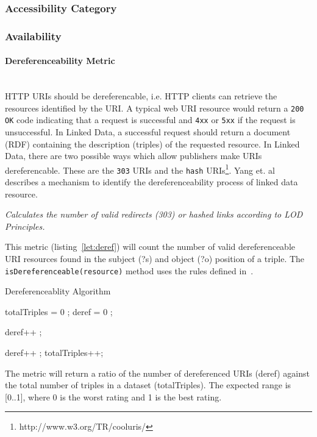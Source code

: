
\subsubsection{Accessibility Category}
\label{sec:Accessibility} 

\subsubsection{Availability} %

\paragraph{Dereferenceability Metric} ~\\ %
HTTP URIs should be dereferencable, i.e. HTTP clients can retrieve the resources identified by the URI.
A typical web URI resource would return a \texttt{200 OK} code indicating that a request is successful and \texttt{4xx} or \texttt{5xx} if the request is unsuccessful. 
In Linked Data, a successful request should return a document (RDF) containing the description (triples) of the requested resource.
In Linked Data, there are two possible ways which allow publishers make URIs dereferencable.
These are the \texttt{303} URIs and the \texttt{hash} URIs\footnote{http://www.w3.org/TR/cooluris/}.
Yang et. al~\cite{Yang2011} describes a mechanism to identify the dereferenceability process of linked data resource.
\begin{mdframed}[style=metricdefinition]
\emph{Calculates the number of valid redirects (303) or hashed links according to LOD Principles.}
\end{mdframed}

This metric (listing~\ref{let:deref}) will count the number of valid dereferenceable URI resources found in the subject (?s) and object (?o) position of a triple. The \texttt{isDereferenceable(resource)} method uses the rules defined in~\cite{Yang2011}.
\begin{algorithm}
\caption{Dereferenceablity Algorithm}\label{lst:deref}
\begin{algorithmic}[1]
\State totalTriples = 0 ;
\State deref = 0 ;
\EndProcedure

 deref++ ; \EndIf

 deref++ ; \EndIf
\State totalTriples++;
\EndProcedure
\end{algorithmic}
\end{algorithm}
The metric will return a ratio of the number of dereferenced URIs (deref) against the total number of triples in a dataset (totalTriples). The expected range is [0..1], where 0 is the worst rating and 1 is the best rating.


